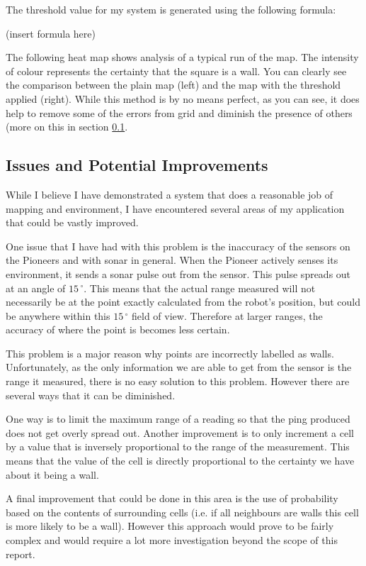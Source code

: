 \documentclass{article}
\begin{document}
The threshold value for my system is generated using the following formula:

(insert formula here)

The following heat map shows analysis of a typical run of the map. The intensity of colour represents the certainty that the square is a wall. You can clearly see the comparison between the plain map (left) and the map with the threshold applied (right). While this method is by no means perfect, as you can see, it does help to remove some of the errors from grid and diminish the presence of others (more on this in section \ref{sec:issues}.

\subsection{Issues and Potential Improvements}
\label{sec:issues}
While I believe I have demonstrated a system that does a reasonable job of mapping and environment, I have encountered several areas of my application that could be vastly improved.

One issue that I have had with this problem is the inaccuracy of the sensors on the Pioneers and with sonar in general. When the Pioneer actively senses its environment, it sends a sonar pulse out from the sensor. This pulse spreads out at an angle of $15\,^\circ$. This means that the actual range measured will not necessarily be at the point exactly calculated from the robot's position, but could be anywhere within this $15\,^\circ$ field of view. Therefore at larger ranges, the accuracy of where the point is becomes less certain.

This problem is a major reason why points are incorrectly labelled as walls. Unfortunately, as the only information we are able to get from the sensor is the range it measured, there is no easy solution to this problem. However there are several ways that it can be diminished. 

One way is to limit the maximum range of a reading so that the ping produced does not get overly spread out. Another improvement is to only increment a cell by a value that is inversely proportional to the range of the measurement. This means that the value of the cell is directly proportional to the certainty we have about it being a wall. 

A final improvement that could be done in this area is the use of probability based on the contents of surrounding cells (i.e. if all neighbours are walls this cell is more likely to be a wall). However this approach would prove to be fairly complex and would require a lot more investigation beyond the scope of this report.
\end{document}
